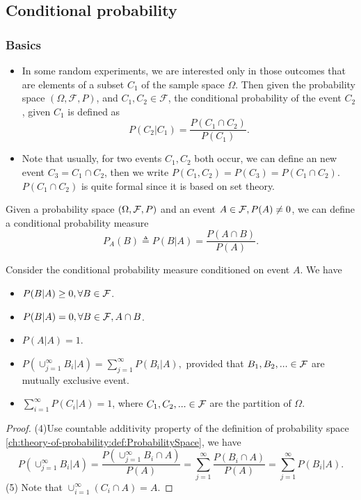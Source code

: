\begin{refsection}
\subsection{Conditional probability}
\subsubsection{Basics}


\begin{remark}\hfill
	\begin{itemize}
		\item In some random experiments, we are interested only in those outcomes that are elements of a subset $C_1$ of the sample space $\Omega$. Then given the probability space $(\Omega,\mathcal{F},P)$, and  $C_1,C_2 \in \mathcal{F}$, the conditional probability of the event $C_2$, given $C_1$ is defined as 
		$$P(C_2 | C_1) = \frac{P(C_1\cap C_2)}{P(C_1)}.$$
		\item Note that usually, for two events $C_1,C_2$ both occur, we can define an new event $C_3 = C_1 \cap C_2$, then we write $P(C_1,C_2) = P(C_3) = P(C_1\cap C_2)$. $P(C_1\cap C_2)$ is quite formal since it is based on set theory.
	\end{itemize}	
\end{remark}

\begin{definition}
	Given a probability space $(\Omega, \mathcal{F}, P)$ and an event $A\in \mathcal{F}, P(A)\neq 0$, we can define a conditional probability measure
	$$P_A(B) \triangleq P(B|A) = \frac{P(A\cap B)}{P(A)}.$$		
\end{definition}

\begin{lemma}\cite{hoggintroduction}
	Consider the conditional probability measure conditioned on event $A$. We have	
	\begin{itemize}
		\item $P(B|A) \geq 0, \forall B\in \mathcal{F}$.
		\item $P(B|A) = 0, \forall B\in \mathcal{F}, A\cap B$.
		\item $P(A|A) = 1$.
		\item $P(\cup_{j=1}^\infty B_i|A) = \sum_{j=1}^\infty P(B_i|A),$ provided that $B_1,B_2,...\in \mathcal{F}$ are mutually exclusive event.
		
		\item $\sum_{i=1}^\infty P(C_i|A) = 1$, where $C_1,C_2,... \in \mathcal{F}$ are the partition of $\Omega$.
	\end{itemize}	
\end{lemma}
\begin{proof}
	(4)Use countable additivity property of the definition of probability space
	\autoref{ch:theory-of-probability:def:ProbabilitySpace}, we have
	$$P(\cup_{j=1}^\infty B_i|A) = \frac{P(\cup_{j=1}^\infty  B_i\cap A)}{P(A)} = \sum_{j=1}^\infty \frac{P(B_i\cap A)}{P(A)} = \sum_{j=1}^\infty P(B_i|A).$$
	(5) Note that $\cup_{i=1}^\infty (C_i\cap A) = A$.
\end{proof}


\end{refsection}
